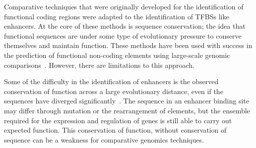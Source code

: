 







        Comparative techniques that were originally developed for the identification of functional coding regions were adapted to the identification of TFBSs like enhancers. At the core of these methods is sequence conservation; the idea that functional sequences are under some type of evolutionary pressure to conserve themselves and maintain function. These methods have been used with success in the prediction of functional non-coding elements using large-scale genomic comparisons~\cite{aparicio2002whole, gottgens2000analysis, loots2000identification, mouse2002initial}. However, there are limitations to this approach.

        Some of the difficulty in the identification of enhancers is the observed conservation of function across a large evolutionary distance, even if the sequences have diverged significantly~\cite{tautz2000evolution, pennacchio2013enhancers}. The sequence in an enhancer binding site may differ through mutation or the rearrangement of elements, but the ensemble required for the expression and regulation of genes is still able to carry out expected function. This conservation of function, without conservation of sequence can be a weakness for comparative genomics techniques. 
        
